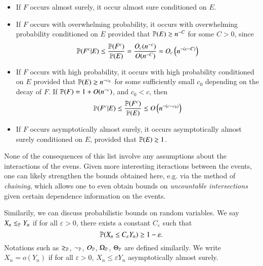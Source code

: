 \begin{itemize}
    \item If $F$ occurs almost surely, it occur almost sure conditioned on $E$.

    \item If $F$ occurs with overwhelming probability, it occurs with overwhelming probability conditioned on $E$ provided that $\operatorname{\mathbb{P}}(E) \gtrsim n^{-C}$ for some $C > 0$, since
    \[ \mathbb{P}(F^c|E) \leq \frac{\mathbb{P}(F^c)}{\mathbb{P}(E)} = \frac{O_c(n^{-c})}{O(n^{-C})} = O_c \left( n^{-(c - C)} \right) \]

    \item If $F$ occurs with high probability, it occurs with high probability conditioned on $E$ provided that $\operatorname{\mathbb{P}}(E) \gtrsim n^{-c_0}$ for some sufficiently small $c_0$ depending on the decay of $F$. If $\mathbb{P}(F) = 1 + O(n^{-c})$, and $c_0 < c$, then
    \[ \mathbb{P}(F^c|E) \leq \frac{\mathbb{P}(F^c)}{\mathbb{P}(E)} \leq O \left(n^{-(c - c_0)} \right) \]

    \item If $F$ occurs asymptotically almost surely, it occurs asymptotically almost surely conditioned on $E$, provided that $\operatorname{\mathbb{P}}(E) \gtrsim 1$.
\end{itemize}

None of the consequences of this list involve any assumptions about the interactions of the evens. Given more interesting iteractions between the events, one can likely strengthen the bounds obtained here, e.g. via the method of \emph{chaining}, which allows one to even obtain bounds on \emph{uncountable intersections} given certain dependence information on the events.

Similarily, we can discuss probabilistic bounds on random variables. We say $X_n \lesssim_{\operatorname{\mathbb{P}}} Y_n$ if for all $\varepsilon > 0$, there exists a constant $C_\varepsilon$ such that
%
\[ \operatorname{\mathbb{P}}(X_n \leq C_\varepsilon Y_n) \geq 1 - \varepsilon. \]
%
Notations such as $\gtrsim_{\operatorname{\mathbb{P}}}$, $\sim_{\operatorname{\mathbb{P}}}$, $O_{\operatorname{\mathbb{P}}}$, $\Omega_{\operatorname{\mathbb{P}}}$, $\Theta_{\operatorname{\mathbb{P}}}$ are defined similarily. We write $X_n = o(Y_n)$ if for all $\varepsilon > 0$, $X_n \leq \varepsilon Y_n$ asymptotically almost surely.



